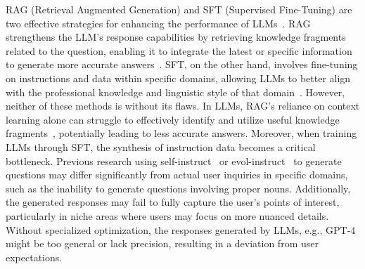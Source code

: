 
RAG (Retrieval Augmented Generation) and SFT (Supervised Fine-Tuning) are two effective strategies for enhancing the performance of LLMs~\cite{}. RAG strengthens the LLM’s response capabilities by retrieving knowledge fragments related to the question, enabling it to integrate the latest or specific information to generate more accurate answers~\cite{}. SFT, on the other hand, involves fine-tuning on instructions and data within specific domains, allowing LLMs to better align with the professional knowledge and linguistic style of that domain~\cite{}. However, neither of these methods is without its flaws. In LLMs, RAG’s reliance on context learning alone can struggle to effectively identify and utilize useful knowledge fragments~\cite{Asai2023SelfRAGLT,zhang2024raft}, potentially leading to less accurate answers. Moreover, when training LLMs through SFT, the synthesis of instruction data becomes a critical bottleneck. Previous research using self-instruct~\cite{Wang2022SelfInstructAL} or evol-instruct~\cite{Xu2023WizardLMEL} to generate questions may differ significantly from actual user inquiries in specific domains, such as the inability to generate questions involving proper nouns. Additionally, the generated responses may fail to fully capture the user’s points of interest, particularly in niche areas where users may focus on more nuanced details. Without specialized optimization, the responses generated by LLMs, e.g., GPT-4 might be too general or lack precision, resulting in a deviation from user expectations.



